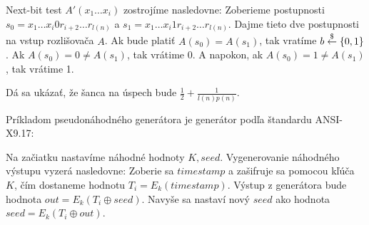 \begin{dokaz}
\begin{itemize}
        Next-bit test $A'(x_1 \dots x_i)$ zostrojíme nasledovne:
        Zoberieme postupnosti $s_0 = x_1 \dots x_i 0 r_{i+2} \dots r_{l(n)}$
        a $s_1 = x_1 \dots x_i 1 r_{i+2} \dots r_{l(n)}$.
        Dajme tieto dve postupnosti na vstup rozlišovača $A$.
        Ak bude platiť $A(s_0) = A(s_1)$, tak vratíme $b \overset{\$}{\leftarrow} \{0,1\}$. 
        Ak $A(s_0) = 0 \ne A(s_1)$, tak vrátime 0.
        A napokon, ak $A(s_0) = 1 \ne A(s_1)$, tak vrátime 1.

        Dá sa ukázať, že šanca na úspech bude 
        $\frac{1}{2} + \frac{1}{l(n)p(n)}$.
    \end{itemize}
\end{dokaz}


\noindent
Príkladom pseudonáhodného generátora je generátor podľa štandardu ANSI-X9.17:

Na začiatku nastavíme náhodné hodnoty $K, seed$. 
Vygenerovanie náhodného výstupu vyzerá nasledovne: 
Zoberie sa $timestamp$ a zašifruje sa pomocou kľúča $K$,
čím dostaneme hodnotu $T_i = E_k(timestamp)$. Výstup z generátora bude
hodnota $out = E_k(T_i \oplus seed)$. 
Navyše sa nastaví nový $seed$ ako hodnota $seed=E_k(T_i \oplus out)$.
